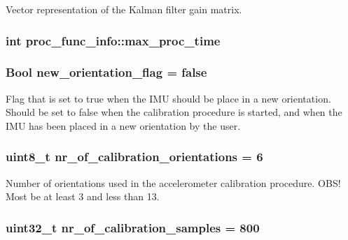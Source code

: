 \-Vector representation of the \-Kalman filter gain matrix. 

\hypertarget{group__tables_ga128ad5d7538eef603b5f0dab9c42174b}{
\subsubsection[{max\-\_\-proc\-\_\-time}]{\setlength{\rightskip}{0pt plus 5cm}int {\bf proc\-\_\-func\-\_\-info\-::max\-\_\-proc\-\_\-time}}}
\label{group__tables_ga128ad5d7538eef603b5f0dab9c42174b}
\hypertarget{group__tables_ga9340627920ea2445fe1469547bc64eae}{
\subsubsection[{new\-\_\-orientation\-\_\-flag}]{\setlength{\rightskip}{0pt plus 5cm}\-Bool {\bf new\-\_\-orientation\-\_\-flag} = false}}
\label{group__tables_ga9340627920ea2445fe1469547bc64eae}


\-Flag that is set to true when the \-I\-M\-U should be place in a new orientation. \-Should be set to false when the calibration procedure is started, and when the \-I\-M\-U has been placed in a new orientation by the user. 

\hypertarget{group__tables_ga642a3ad33a0242f4e12fe46a13b0303f}{
\subsubsection[{nr\-\_\-of\-\_\-calibration\-\_\-orientations}]{\setlength{\rightskip}{0pt plus 5cm}uint8\-\_\-t {\bf nr\-\_\-of\-\_\-calibration\-\_\-orientations} = 6}}
\label{group__tables_ga642a3ad33a0242f4e12fe46a13b0303f}


\-Number of orientations used in the accelerometer calibration procedure. \-O\-B\-S! \-Most be at least 3 and less than 13. 

\hypertarget{group__tables_gab9d05ce5927a225127eff6993856da19}{
\subsubsection[{nr\-\_\-of\-\_\-calibration\-\_\-samples}]{\setlength{\rightskip}{0pt plus 5cm}uint32\-\_\-t {\bf nr\-\_\-of\-\_\-calibration\-\_\-samples} = 800}}
\label{group__tables_gab9d05ce5927a225127eff6993856da19}


